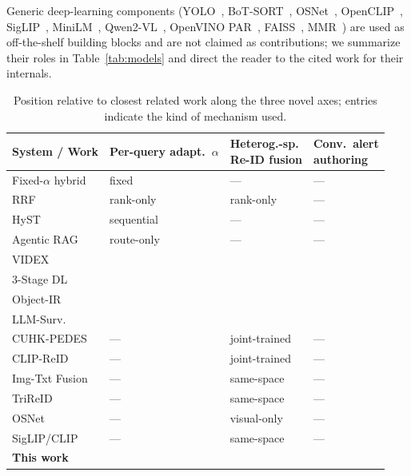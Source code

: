 ﻿\documentclass[conference]{IEEEtran}
\theoremstyle{definition}
\newcommand{\cmark}{\ding{51}}
\newcommand{\xmark}{\ding{55}}
\begin{document}
Generic deep-learning components (YOLO~\cite{b13,b14}, BoT-SORT~\cite{b22}, OSNet~\cite{b22b}, OpenCLIP~\cite{b18,b18b}, SigLIP~\cite{b24}, MiniLM~\cite{b23}, Qwen2-VL~\cite{b17}, OpenVINO PAR~\cite{b15}, FAISS~\cite{b25}, MMR~\cite{b26}) are used as off-the-shelf building blocks and are not claimed as contributions; we summarize their roles in Table~\ref{tab:models} and direct the reader to the cited work for their internals.

\begin{table}[!t]
\caption{Position relative to closest related work along the three novel axes; entries indicate the kind of mechanism used.}
\label{tab:related}
\centering
\scriptsize
\setlength{\tabcolsep}{3pt}
\begin{tabular}{@{}p{2.6cm}p{1.25cm}p{1.45cm}p{1.05cm}@{}}
\toprule
System / Work & \makecell[l]{Per-query\\ adapt.\ $\alpha$} & \makecell[l]{Heterog.-sp.\\ Re-ID fusion} & \makecell[l]{Conv.\ alert\\ authoring} \\
\midrule
Fixed-$\alpha$ hybrid~\cite{b29}     & fixed       & ---            & --- \\
RRF~\cite{b27}                        & rank-only   & rank-only      & --- \\
HyST~\cite{b30}                       & sequential  & ---            & --- \\
Agentic RAG~\cite{b3}                 & route-only  & ---            & --- \\
VIDEX~\cite{b7}                       & \xmark      & \xmark         & \xmark \\
3-Stage DL~\cite{b12}                 & \xmark      & \xmark         & \xmark \\
Object-IR~\cite{b11}                  & \xmark      & \xmark         & \xmark \\
LLM-Surv.~\cite{b1}                   & \xmark      & \xmark         & \xmark \\
CUHK-PEDES~\cite{b32}                 & ---         & joint-trained  & --- \\
CLIP-ReID~\cite{b33}                  & ---         & joint-trained  & --- \\
Img-Txt Fusion~\cite{b34}             & ---         & same-space     & --- \\
TriReID~\cite{b35}                    & ---         & same-space     & --- \\
OSNet~\cite{b22b}                     & ---         & visual-only    & --- \\
SigLIP/CLIP~\cite{b24}                & ---         & same-space     & --- \\
\textbf{This work}                    & \cmark      & \cmark         & \cmark \\
\bottomrule
\end{tabular}
\end{table}
\end{document}
